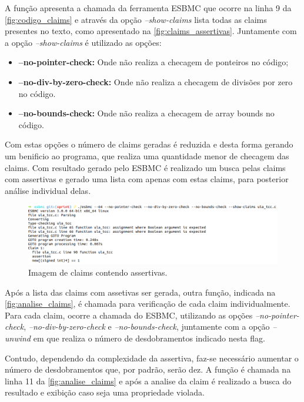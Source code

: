 \par
A função apresenta a chamada da ferramenta ESBMC que ocorre na linha 9 da \autoref{fig:codigo_claims} e através da opção \textit{--show-claims} lista todas as claims presentes no texto, como apresentado na \autoref{fig:claims_assertivas}. Juntamente com a opção \textit{--show-claims} é utilizado as opções:
\begin{itemize}
    \item \textbf{--no-pointer-check:} Onde não realiza a checagem de ponteiros no código;
    \item \textbf{--no-div-by-zero-check:} Onde não realiza a checagem de divisões por zero no código.
    \item \textbf{--no-bounds-check:} Onde não realiza a checagem de array bounds no código.
\end{itemize}
Com estas opções o número de claims geradas é reduzida e desta forma gerando um benificio ao programa, que realiza uma quantidade menor de checagem das claims. Com resultado gerado pelo ESBMC é realizado um busca pelas claims com assertivas e gerado uma lista com apenas com estas claims, para posterior análise individual delas.
\begin{figure}[H]
	\begin{center}
    \caption{\label{fig:claims_assertivas}Imagem de claims contendo assertivas.}
	\includegraphics[scale=0.55 ]{Figuras/lista_claim.png}
	\end{center}
\end{figure}
\par
Após a lista das claims com assetivas ser gerada, outra função, indicada na \autoref{fig:analise_claims}, é chamada para verificação de cada claim individualmente. Para cada claim, ocorre a chamada do ESBMC, utilizando as opções \textit{--no-pointer-check}, \textit{--no-div-by-zero-check} e \textit{--no-bounds-check}, juntamente com a opção \textit{--unwind} em que realiza o número de desdobramentos indicado nesta flag. 

\par
Contudo, dependendo da complexidade da assertiva, faz-se necessário aumentar o número de desdobramentos que, por padrão, serão dez. A função é chamada na linha 11 da \autoref{fig:analise_claims} e após a analise da claim é realizado a busca do resultado e exibição caso seja uma propriedade violada.

